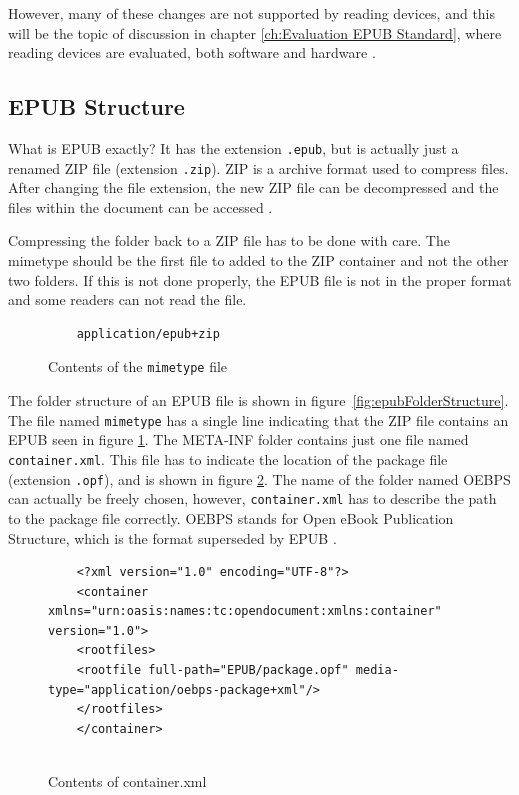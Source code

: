 However, many of these changes are not supported by reading devices, and this will be the topic of discussion in chapter \ref{ch:Evaluation EPUB Standard}, where reading devices are evaluated, both software and hardware \cite{EPUB30changes}.


\subsection{EPUB Structure}
What is EPUB exactly? It has the extension \lstinline{.epub}, but is actually just a renamed ZIP file (extension \lstinline{.zip}). ZIP is a archive format used to compress files. After changing the file extension, the new ZIP file can be decompressed and the files within the document can be accessed \cite{EPUB3bp}.

Compressing the folder back to a ZIP file has to be done with care. The mimetype should be the first file to added to the ZIP container and not the other two folders. If this is not done properly, the EPUB file is not in the proper format and some readers can not read the file.


\begin{figure}
	\begin{lstlisting}
	application/epub+zip
	\end{lstlisting}
	\caption{Contents of the \lstinline{mimetype} file}
	\label{fig:mimetype}
\end{figure}

The folder structure of an EPUB file is shown in figure~\ref{fig:epubFolderStructure}. The file named \lstinline{mimetype} has a single line indicating that the ZIP file contains an EPUB seen in figure \ref{fig:mimetype}. The META-INF folder contains just one file named \lstinline{container.xml}. This file has to indicate the location of the package file (extension \lstinline{.opf}), and is shown in figure \ref{fig:containerXML}. The name of the folder named OEBPS can actually be freely chosen, however, \lstinline{container.xml} has to describe the path to the package file correctly. OEBPS stands for Open eBook Publication Structure, which is the format superseded by EPUB \cite{OPSspecs}.

\begin{figure}
	\begin{lstlisting}
	<?xml version="1.0" encoding="UTF-8"?>
	<container xmlns="urn:oasis:names:tc:opendocument:xmlns:container" version="1.0">
	<rootfiles>
	<rootfile full-path="EPUB/package.opf" media-type="application/oebps-package+xml"/>
	</rootfiles>
	</container>
	
	\end{lstlisting}
	\caption{Contents of container.xml}
	\label{fig:containerXML}
\end{figure}

